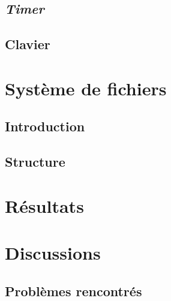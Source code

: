 \documentclass[a4paper, 12pt]{article}
\begin{document}

\subsection{\textit{Timer}}


\subsection{Clavier}

\newpage

\section{Système de fichiers}
\subsection{Introduction}


\subsection{Structure}

\newpage

\section{Résultats}

\newpage

\section{Discussions}
\subsection{Problèmes rencontrés}
\end{document}
